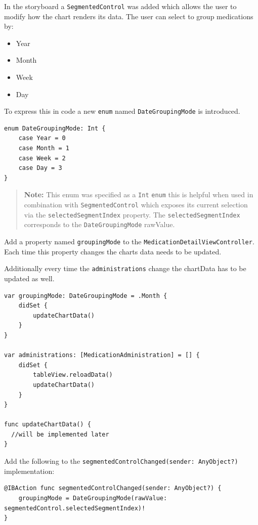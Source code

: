 \documentclass{article}
\begin{document}
In the storyboard a \texttt{SegmentedControl} was added which allows the
user to modify how the chart renders its data. The user can select to
group medications by:

\begin{itemize}
  \item
    Year
  \item
    Month
  \item
    Week
  \item
    Day
\end{itemize}

To express this in code a new \texttt{enum} named
\texttt{DateGroupingMode} is introduced.

\begin{verbatim}
enum DateGroupingMode: Int {
    case Year = 0
    case Month = 1
    case Week = 2
    case Day = 3
}
\end{verbatim}

\begin{quote}
\textbf{Note:} This enum was specified as a \texttt{Int} \texttt{enum}
this is helpful when used in combination with \texttt{SegmentedControl}
which exposes its current selection via the
\texttt{selectedSegmentIndex} property. The
\texttt{selectedSegmentIndex} corresponds to the
\texttt{DateGroupingMode} rawValue.
\end{quote}

Add a property named \texttt{groupingMode} to the
\texttt{MedicationDetailViewController}. Each time this property changes
the charts data needs to be updated.

Additionally every time the \texttt{administrations} change the
chartData has to be updated as well.

\begin{verbatim}
var groupingMode: DateGroupingMode = .Month {
    didSet {
        updateChartData()
    }
}

var administrations: [MedicationAdministration] = [] {
    didSet {
        tableView.reloadData()
        updateChartData()
    }
}

func updateChartData() {
  //will be implemented later
}
\end{verbatim}

Add the following to the
\texttt{segmentedControlChanged(sender:\ AnyObject?)} implementation:

\begin{verbatim}
@IBAction func segmentedControlChanged(sender: AnyObject?) {
    groupingMode = DateGroupingMode(rawValue: segmentedControl.selectedSegmentIndex)!
}
\end{verbatim}
\end{document}
